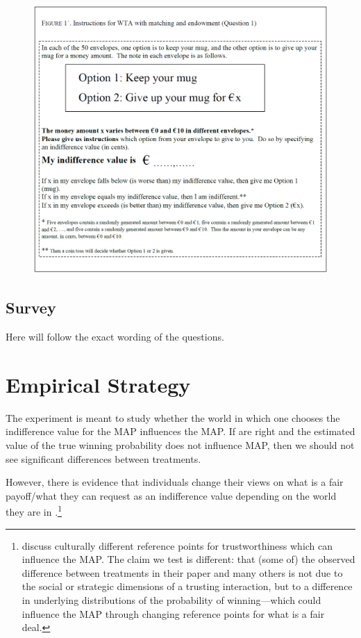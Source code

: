 \begin{figure}[h!]
  \centering
 {\includegraphics[width=0.95\linewidth]{Wakker_image.pdf}}
  \label{fig:instr}
\end{figure}

\subsection{Survey}
Here will follow the exact wording of the questions.



\section{Empirical Strategy}
The experiment is meant to study whether the world in which one chooses the indifference value for the MAP influences the MAP.
If \cite{Bohnet2008} are right and the estimated value of the true winning probability does not influence MAP, then we should not see significant differences between treatments.

However, there is evidence that individuals change their views on what is a fair payoff/what they can request as an indifference value depending on the world they are in \citep{Bohnet2008,Bohnet2010}.\footnote{
\cite{Bohnet2010} discuss culturally different reference points for trustworthiness which can influence the MAP.
The claim we test is different: that (some of) the observed difference between treatments in their paper and many others is not due to the social or strategic dimensions of a trusting interaction, but to a difference in underlying distributions of the probability of winning---which could influence the MAP through changing reference points for what is a fair deal.
}

